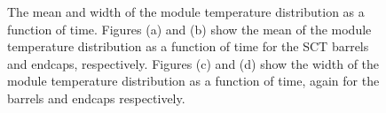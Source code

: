 \begin{figure}[h]
 	\centering
  \caption[The mean and width of the module temperature distribution as a
  function of time.]
  {The mean and width of the module temperature distribution as a
  function of time. Figures (a) and (b) show the mean of the module temperature
  distribution as a function of time for the SCT barrels and endcaps,
  respectively. Figures (c) and (d) show the width of the module temperature
  distribution as a function of time, again for the barrels and endcaps
  respectively.}
	\label{fig:sigma-evo-tdiff}
\end{figure}

